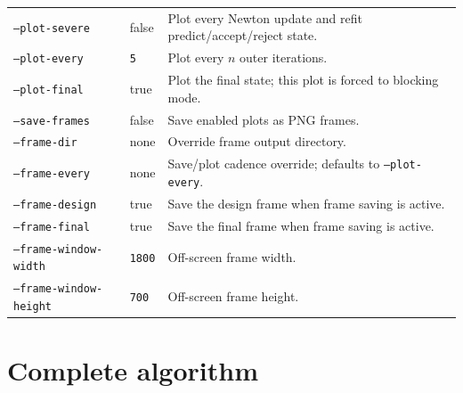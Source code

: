 \documentclass[11pt]{article}
\begin{document}
\begin{longtable}{>{\raggedright\arraybackslash}p{}
                  >{\raggedright\arraybackslash}p{}
                  >{\raggedright\arraybackslash}p{}}
\texttt{--plot-severe} & false & Plot every Newton update and refit predict/accept/reject state. \\
\texttt{--plot-every} & \texttt{5} & Plot every $n$ outer iterations. \\
\texttt{--plot-final} & true & Plot the final state; this plot is forced to blocking mode. \\
\texttt{--save-frames} & false & Save enabled plots as PNG frames. \\
\texttt{--frame-dir} & none & Override frame output directory. \\
\texttt{--frame-every} & none & Save/plot cadence override; defaults to \texttt{--plot-every}. \\
\texttt{--frame-design} & true & Save the design frame when frame saving is active. \\
\texttt{--frame-final} & true & Save the final frame when frame saving is active. \\
\texttt{--frame-window-width} & \texttt{1800} & Off-screen frame width. \\
\texttt{--frame-window-height} & \texttt{700} & Off-screen frame height. \\
\end{longtable}
\endgroup

\section{Complete algorithm}
\end{document}

